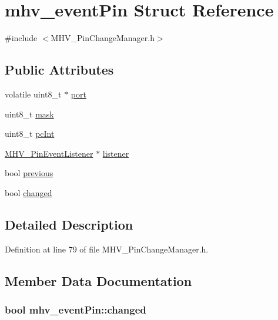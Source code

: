 \hypertarget{structmhv__event_pin}{
\section{mhv\-\_\-event\-Pin \-Struct \-Reference}
\label{structmhv__event_pin}
}


{\ttfamily \#include $<$\-M\-H\-V\-\_\-\-Pin\-Change\-Manager.\-h$>$}

\subsection*{\-Public \-Attributes}
\begin{DoxyCompactItemize}
\item 
volatile uint8\-\_\-t $\ast$ \hyperlink{structmhv__event_pin_a582f202dfe1a27124cfea3776a65c9e2}{port}
\item 
uint8\-\_\-t \hyperlink{structmhv__event_pin_a28a7cf2eb643ead207ce1e1c4dcab533}{mask}
\item 
uint8\-\_\-t \hyperlink{structmhv__event_pin_a94d11da6ceacb80c9c2f30edbe99bd0e}{pc\-Int}
\item 
\hyperlink{class_m_h_v___pin_event_listener}{\-M\-H\-V\-\_\-\-Pin\-Event\-Listener} $\ast$ \hyperlink{structmhv__event_pin_a90fdc2fdc188f1b614a41b45a7f6ba6c}{listener}
\item 
bool \hyperlink{structmhv__event_pin_a6c6bc6a868d6402c34a5024447473618}{previous}
\item 
bool \hyperlink{structmhv__event_pin_ac97303a03e69848a7c32f8e4f61ff824}{changed}
\end{DoxyCompactItemize}


\subsection{\-Detailed \-Description}


\-Definition at line 79 of file \-M\-H\-V\-\_\-\-Pin\-Change\-Manager.\-h.



\subsection{\-Member \-Data \-Documentation}
\hypertarget{structmhv__event_pin_ac97303a03e69848a7c32f8e4f61ff824}{
\subsubsection[{changed}]{\setlength{\rightskip}{0pt plus 5cm}bool {\bf mhv\-\_\-event\-Pin\-::changed}}}
\label{structmhv__event_pin_ac97303a03e69848a7c32f8e4f61ff824}


